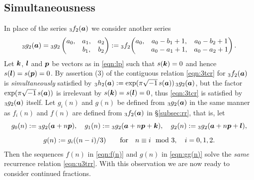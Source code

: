 \documentclass[a4paper,12pt]{article}
\theoremstyle{plain}
\def\ba{\mbox{\boldmath $a$}}
\def\bk{\mbox{\boldmath $k$}}
\def\bl{\mbox{\boldmath $l$}}
\def\bp{\mbox{\boldmath $p$}}
\begin{document}
\subsection{Simultaneousness} \label{subsec:simult}
In place of the series ${}_3f_2(\ba)$ we consider another series 
\begin{equation} \label{eqn:3g2}
{}_3g_2(\ba) = 
{}_3g_2\begin{pmatrix}
a_0, & a_1, & a_2 \\
     & b_1, & b_2 
\end{pmatrix}
:= 
{}_3f_2 \! 
\begin{pmatrix} 
a_0, & a_0-b_1+1, & a_0-b_2+1 \\
     & a_0-a_1+1, & a_0-a_2+1   
\end{pmatrix}. 
\end{equation}
Let $\bk$, $\bl$ and $\bp$ be vectors as in \eqref{eqn:lp} such that $s(\bk) = 0$ 
and hence $s(\bl) = s(\bp) = 0$. 
By assertion (3) of \cite[Theorem 1.1]{EI} the contiguous relation 
\eqref{eqn:3tcr} for ${}_3f_2(\ba)$ is {\sl simultaneously} satisfied by 
${}_3h_2(\ba) := \exp( \pi \sqrt{-1} \, s(\ba)) \, {}_3g_2(\ba)$, but    
the factor $\exp( \pi \sqrt{-1} \, s(\ba))$ is irrelevant by 
$s(\bk) = s(\bl) = 0$, thus \eqref{eqn:3tcr} is satisfied by ${}_3g_2(\ba)$ itself.   
Let $g_i(n)$ and $g(n)$ be defined from ${}_3g_2(\ba)$ in the same manner 
as $f_i(n)$ and $f(n)$ are defined from ${}_3f_2(\ba)$ in \S\ref{subsec:rr}, that is, let       
\begin{subequations} \label{eqn:gi(n)-g(n)} 
\begin{gather}
g_0(n) := {}_3g_2(\ba + n \bp), \quad 
g_1(n) := {}_3g_2(\ba + n \bp + \bk), \quad 
g_2(n) := {}_3g_2(\ba + n \bp + \bl),  \label{eqn:gi(n)} \\[2mm]
g(n) := g_i((n-i)/3) \qquad \mbox{for} \quad n \equiv i \mod 3, \quad i = 0,1,2. 
\label{eqn:gg(n)} 
\end{gather}   
\end{subequations}
Then the sequences $f(n)$ in \eqref{eqn:f(n)} and $g(n)$ in \eqref{eqn:gg(n)} 
solve the {\sl same} recurrence relation \eqref{eqn:u3trr}. 
With this observation we are now ready to consider continued fractions.    
\end{document}

